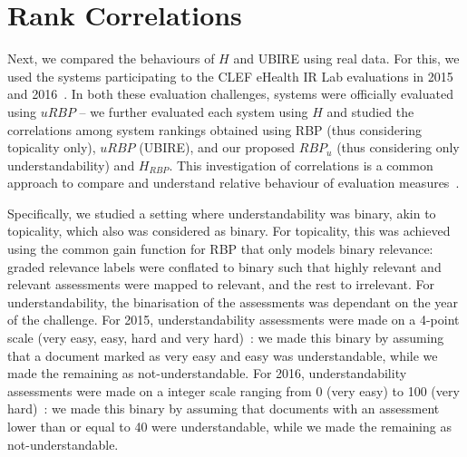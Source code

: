 



\section{Rank Correlations} %
\label{sec:clef}
Next, we compared the behaviours of $H$ and UBIRE using real data. For this, we used the systems participating to the CLEF eHealth IR Lab evaluations in 2015 and 2016~\cite{clefIR15,clefIR16}. In both these evaluation challenges, systems were officially evaluated using $uRBP$ -- we further evaluated each system using $H$ and studied the correlations among system rankings obtained using RBP (thus considering topicality only), $uRBP$ (UBIRE), and our proposed $RBP_u$ (thus considering only understandability) and $H_{RBP}$. This investigation of correlations is a common approach to compare and understand relative behaviour of evaluation measures~\cite{zuccon16}. 

Specifically, we studied a setting where understandability was binary, akin to topicality, which also was considered as binary. For topicality, this was achieved using the common gain function for RBP that only models binary relevance: graded relevance labels were conflated to binary such that highly relevant and relevant assessments were mapped to relevant, and the rest to irrelevant. For understandability, the binarisation of the assessments was dependant on the year of the challenge. For 2015, understandability assessments were made on a 4-point scale (very easy, easy, hard and very hard)~\cite{clefIR15}: we made this binary by assuming that a document marked as very easy and easy was understandable, while we made the remaining as not-understandable. For 2016, understandability assessments were made on a integer scale ranging from 0 (very easy) to 100 (very hard)~\cite{clefIR16}: we made this binary by assuming that documents with an assessment lower than or equal to 40 were understandable, while we made the remaining as not-understandable. 



